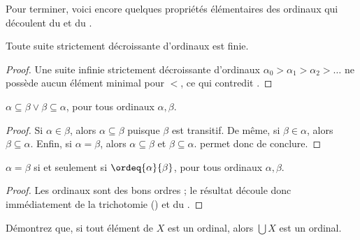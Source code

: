 \documentclass[../../../include/open-logic-section]{subfiles}
\begin{document}
Pour terminer, voici encore quelques propriétés élémentaires des
ordinaux qui découlent du  et du
.

\begin{prop}
Toute suite strictement décroissante d'ordinaux est finie.
\end{prop}

\begin{proof}
Une suite infinie strictement décroissante d'ordinaux
$\alpha_0 > \alpha_1 > \alpha_2 > \ldots$ ne possède aucun
élément minimal pour $<$, ce qui contredit
.
\end{proof}

\begin{prop}
$\alpha \subseteq \beta \lor \beta \subseteq \alpha$, pour tous
ordinaux $\alpha, \beta$.
\end{prop}

\begin{proof}
Si $\alpha \in \beta$, alors $\alpha \subseteq \beta$ puisque
$\beta$ est transitif. De même, si $\beta \in \alpha$, alors
$\beta \subseteq \alpha$. Enfin, si $\alpha = \beta$, alors
$\alpha \subseteq \beta$ et $\beta \subseteq \alpha$.
 permet donc de conclure.
\end{proof}

\begin{prop}
$\alpha = \beta$ si et seulement si $\ordeq{\alpha}{\beta}$, pour
tous ordinaux $\alpha, \beta$.
\end{prop}

\begin{proof}
Les ordinaux sont des bons ordres ; le résultat découle donc
immédiatement de la trichotomie () et du
.
\end{proof}

\begin{prob}
Démontrez que, si tout élément de $X$ est un ordinal, alors
$\bigcup X$ est un ordinal.
\end{prob}
\end{document}
